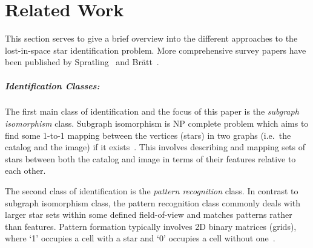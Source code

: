 \newcommand{\nsubparagraph}[1]{\subparagraph{\textbf{#1}}}


\section{Related Work}\label{sec:relatedWork}
This section serves to give a brief overview into the different approaches to the lost-in-space star identification
problem.
More comprehensive survey papers have been published by Spratling~\cite{spratling:surveyStarIdentification} and
Br\"{a}tt~\cite{bratt:analysisStarIdentification}.

\nsubparagraph{Identification Classes:}
The first main class of identification and the focus of this paper is the \textit{subgraph isomorphism} class.
Subgraph isomorphism is NP complete problem which aims to find some 1-to-1 mapping between the vertices (stars) in two
graphs (i.e.\ the catalog and the image) if it exists~\cite{scott:graphIsomorphismProblem}.
This involves describing and mapping sets of stars between both the catalog and image in terms of their features
relative to each other.

The second class of identification is the \textit{pattern recognition} class.
In contrast to subgraph isomorphism class, the pattern recognition class commonly deals with larger star sets within
some defined field-of-view and matches patterns rather than features.
Pattern formation typically involves 2D binary matrices (grids), where `1' occupies a cell with a star and `0' occupies
a cell without one~\cite{padgett:gridAlgorithm}.

%
%
%

